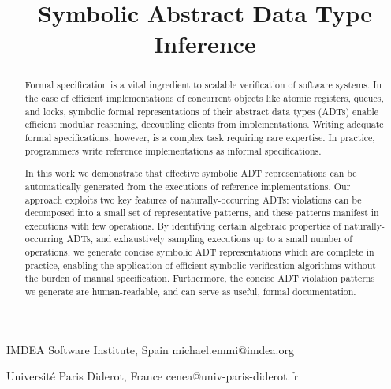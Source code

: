 \documentclass[9pt,natbib,authoryear]{sigplanconf}
\begin{document}
\setlength{\pdfpageheight}{\paperheight}
\setlength{\pdfpagewidth}{\paperwidth}

\toappear{}





\title{Symbolic Abstract Data Type Inference}

           {IMDEA Software Institute, Spain}
           {michael.emmi@imdea.org}

           {Université Paris Diderot, France}
           {cenea@univ-paris-diderot.fr}

\maketitle

\begin{abstract}

  Formal specification is a vital ingredient to scalable verification of
  software systems. In the case of efficient implementations of concurrent
  objects like atomic registers, queues, and locks, symbolic formal
  representations of their abstract data types (ADTs) enable efficient modular
  reasoning, decoupling clients from implementations. Writing adequate formal
  specifications, however, is a complex task requiring rare expertise. In
  practice, programmers write reference implementations as informal
  specifications.

  In this work we demonstrate that effective symbolic ADT representations can
  be automatically generated from the executions of reference implementations.
  Our approach exploits two key features of naturally-occurring ADTs: violations
  can be decomposed into a small set of representative patterns, and these
  patterns manifest in executions with few operations. By identifying certain
  algebraic properties of naturally-occurring ADTs, and exhaustively sampling
  executions up to a small number of operations, we generate concise symbolic
  ADT representations which are complete in practice, enabling the application
  of efficient symbolic verification algorithms without the burden of manual
  specification. Furthermore, the concise ADT violation patterns we generate
  are human-readable, and can serve as useful, formal documentation.

\end{abstract}
\end{document}
